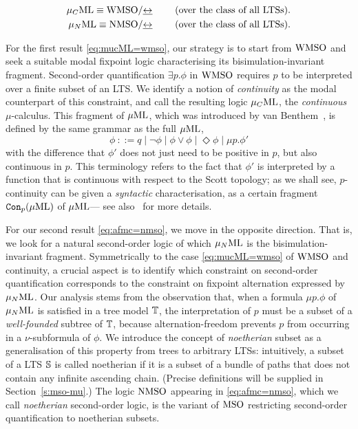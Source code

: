 \begin{theorem}~
   \label{t:11}
\begin{eqnarray}
   \mucML \equiv \wmso/{\bis} \qquad  \text{ (over the class of all LTSs)}. 
\label{eq:mucML=wmso} 
\\ \AFMC \equiv \nmso/{\bis}  \qquad \text{ (over the class of all LTSs)}. 
\label{eq:afmc=nmso}
\end{eqnarray}
\end{theorem}
For the first result \eqref{eq:mucML=wmso}, our strategy is to start from 
$\mathrm{WMSO}$ and seek a suitable modal fixpoint logic characterising its 
bisimulation-invariant fragment. 
Second-order quantification $\exists p.\phi$ in $\mathrm{WMSO}$ requires $p$ to be 
interpreted over a finite subset of an LTS. 
We identify a notion of \emph{continuity} as the modal counterpart of this 
constraint, and call the resulting logic $\mu_{C}\mathrm{ML}$, the \emph{continuous} 
$\mu$-calculus. 
This fragment of $\mu\mathrm{ML}$, which was introduced by van Benthem~\cite{xxxx},
is defined by the same grammar as the full $\mu\mathrm{ML}$,
\begin{equation*}
\phi\ ::= q \mid \neg\phi \mid 
    \phi \lor \phi \mid  \Diamond \phi \mid
    \mu p.\phi' 
\end{equation*}
with the difference that $\phi'$ does not just need to be positive in $p$, but 
also continuous in $p$.
This terminology refers to the fact that $\phi'$ is interpreted by a function 
that is continuous with respect to the Scott topology; as we shall see, 
$p$-continuity can be given a \emph{syntactic} characterisation, as a certain
fragment $\mathtt{Con}_{p}(\mu\mathrm{ML})$ of $\mu\mathrm{ML}$--- see also~\cite{Fontaine08,FV12} for
more details. 

For our second result \eqref{eq:afmc=nmso}, we move in the opposite direction.
That is, we look for a natural second-order logic of which $\mu_{N}\mathrm{ML}$ is the 
bisimulation-invariant fragment. 
Symmetrically to the case \eqref{eq:mucML=wmso} of $\mathrm{WMSO}$ and continuity, a 
crucial aspect is to identify which constraint on second-order quantification
corresponds to the constraint on fixpoint alternation expressed by $\mu_{N}\mathrm{ML}$. 
Our analysis stems from the observation that, when a formula $\mu p.\phi$ of
$\mu_{N}\mathrm{ML}$ is satisfied in a tree model $\mathbb{T}$, the interpretation of $p$ must be
a subset of a \emph{well-founded} subtree of $\mathbb{T}$, because alternation-freedom
prevents $p$ from occurring in a $\nu$-subformula of $\phi$. 
We introduce the concept of \emph{noetherian} subset as a generalisation of 
this property from trees to arbitrary LTSs: intuitively, a subset of a LTS 
$\mathbb{S}$ is called noetherian if it is a subset of a bundle of paths that does
not contain any infinite ascending chain. 
(Precise definitions will be supplied in Section~\ref{s:mso-mu}.)
The logic $\mathrm{NMSO}$ appearing in \eqref{eq:afmc=nmso}, which we call 
\emph{noetherian} second-order logic, is the variant of $\mathrm{MSO}$ restricting 
second-order quantification to noetherian subsets.


